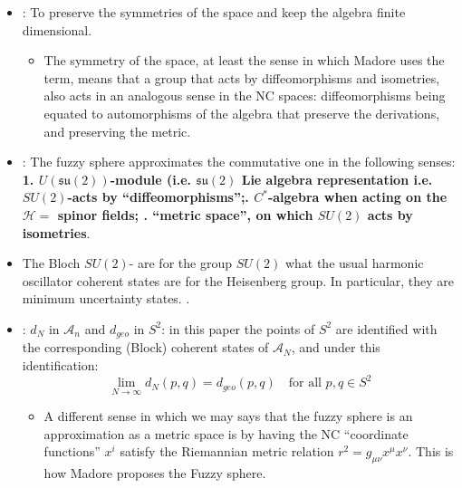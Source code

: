 \documentclass{article}
\newcommand{\alg}[1]{\ensuremath{\mathfrak{#1}}}
\begin{document}
    \begin{itemize}
    
    \item {}: To preserve the symmetries of the space and keep the algebra finite dimensional.
    
        \begin{itemize}
            
        \item The symmetry of the space, at least the sense in which Madore uses the term, means that a group that acts by diffeomorphisms and isometries, also acts in an analogous sense in the NC spaces: diffeomorphisms being equated to automorphisms of the algebra that preserve the derivations, and preserving the metric.
            
        \end{itemize}
    
    
    \item {}: The fuzzy sphere approximates the commutative one in the following senses: \textbf{1. $U(\alg{su}(2))$-module (i.e. $\alg{su}(2)$ Lie algebra representation i.e. $SU(2)$-acts by ``diffeomorphisms'';. $C^*$-algebra when acting on the $\mathcal H = $ spinor fields; . ``metric space'', on which $SU(2)$ acts by isometries}. %
    
    \item The Bloch $SU(2)$- are for the group $SU(2)$ what the usual harmonic oscillator coherent states are for the Heisenberg group. In particular, they are minimum uncertainty states. .
    
    \item {}: $d_N$ in $\mathcal A_n$ and $d_{geo}$ in $S^2$: in this paper the points of $S^2$ are identified with the corresponding (Block) coherent states of $\mathcal A_N$, and under this identification:
    \begin{equation}
        \lim_{N \to \infty} d_N(p, q) = d_{geo}(p, q)\quad \text{for all }p, q \in S^2
    \end{equation}
    
        \begin{itemize}
        
        \item A different sense in which we may says that the fuzzy sphere is an approximation as a metric space is by having the NC ``coordinate functions'' $x^i$ satisfy the Riemannian metric relation $r^2 = g_{\mu \nu} x^\mu x^\nu$. This is how Madore proposes the Fuzzy sphere.
        

\end{itemize}
\end{itemize}
\end{document}
